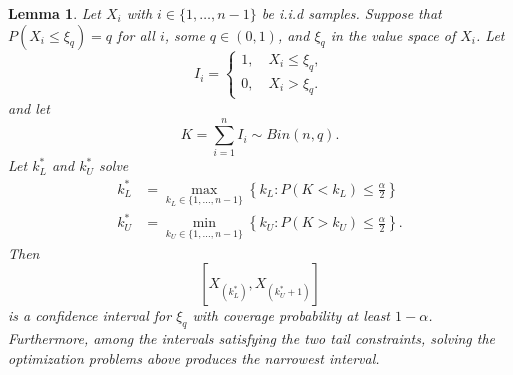 \documentclass{article}
\newtheorem{lemma}{Lemma}
\begin{document}
\begin{lemma}
Let $X_i$ with $i\in\{1,\ldots,n-1\}$ be i.i.d samples. Suppose that $P(X_i\leq \xi_q)=q$ for all $i$, some $q\in(0,1)$, and $\xi_q$ in the value space of $X_i$. Let
$$I_i =
\begin{cases}
1,\quad X_i\leq\xi_q,\\
0,\quad X_i>\xi_q.
\end{cases}$$
and let
$$K=\sum_{i=1}^n I_i\sim Bin(n,q).$$
Let $k_L^*$ and $k_U^*$ solve
$$
\begin{aligned}
k_L^*
&=
\max_{k_L\in\{1,\ldots,n-1\}}
\left\{
k_L:
P(K<k_L)\leq\frac{\alpha}{2}
\right\}\\
k_U^*
&=
\min_{k_U\in\{1,\ldots,n-1\}}
\left\{
k_U:
P(K>k_U)\leq\frac{\alpha}{2}
\right\}.
\end{aligned}
$$
Then
$$[X_{(k_L^*)},X_{(k_U^*+1)}]$$
is a confidence interval for $\xi_q$ with coverage probability at least $1-\alpha$. Furthermore, among the intervals satisfying the two tail constraints, solving the optimization problems above produces the narrowest interval.
\end{lemma}
\end{document}
